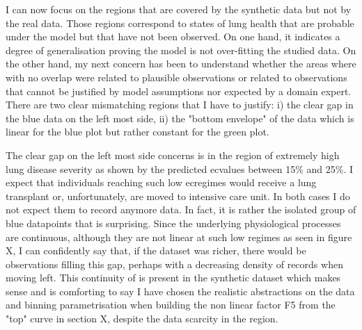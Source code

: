I can now focus on the regions that are covered by the synthetic data but not by the real data. Those regions correspond to states of lung health that are probable under the model but that have not been observed. On one hand, it indicates a degree of generalisation proving the model is not over-fitting the studied data. On the other hand, my next concern has been to understand whether the areas where with no overlap were related to plausible observations or related to observations that cannot be justified by model assumptions nor expected by a domain expert. There are two clear mismatching regions that I have to justify: i) the clear gap in the blue data on the left most side, ii) the "bottom envelope" of the data which is linear for the blue plot but rather constant for the green plot.

The clear gap on the left most side concerns is in the region of extremely high lung disease severity as shown by the predicted ec\F values between 15\% and 25\%. 
I expect that individuals reaching such low ec\F regimes would receive a lung transplant or, unfortunately, are moved to intensive care unit. In both cases I do not expect them to record anymore data. In fact, it is rather the isolated group of blue datapoints that is surprising. Since the underlying physiological processes are continuous, although they are not linear at such low regimes as seen in figure X, I can confidently say that, if the dataset was richer, there would be observations filling this gap, perhaps with a decreasing density of records when moving left. This continuity of is present in the synthetic dataset which makes sense and is comforting to say I have chosen the realistic abstractions on the data and binning parametrisation when building the non linear factor F5 from the "top" curve in section X, despite the data scarcity in the region.

